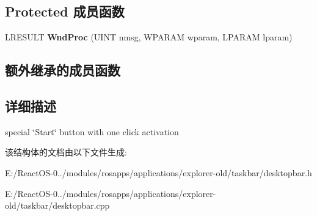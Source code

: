 \subsection*{Protected 成员函数}
\begin{DoxyCompactItemize}
\item 
\mbox{\label{struct_start_button_af78392260fc0751dfec072b070986422}} 
L\+R\+E\+S\+U\+LT {\bfseries Wnd\+Proc} (U\+I\+NT nmsg, W\+P\+A\+R\+AM wparam, L\+P\+A\+R\+AM lparam)
\end{DoxyCompactItemize}
\subsection*{额外继承的成员函数}


\subsection{详细描述}
special \char`\"{}\+Start\char`\"{} button with one click activation 

该结构体的文档由以下文件生成\+:\begin{DoxyCompactItemize}
\item 
E\+:/\+React\+O\+S-\/0../modules/rosapps/applications/explorer-\/old/taskbar/desktopbar.\+h\item 
E\+:/\+React\+O\+S-\/0../modules/rosapps/applications/explorer-\/old/taskbar/desktopbar.\+cpp\end{DoxyCompactItemize}
